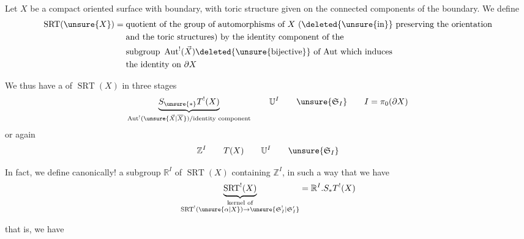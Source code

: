

Let $X$ be a compact oriented surface with boundary, with toric structure
given on the connected components of the boundary.
We define
\[
\begin{aligned}
\operatorname{SRT}(\unsure{X})={}&
\text{quotient of the group of automorphisms of }X
\text{ (\deleted{\unsure{in}} preserving the orientation}\\
&\text{and the toric structures) by the identity component of the}\\
&\text{subgroup }\operatorname{Aut}^!(\vec X)
\deleted{\unsure{\mathrm{bijective}}}
\text{ of Aut which induces}\\
&\text{the identity on }\partial X
\end{aligned}
\]

We thus have a  of $\operatorname{SRT}(X)$ in three stages
\[
\underbrace{S_{\unsure{*}}T^!(X)}_{
\operatorname{Aut}^!(\unsure{\vec X|\overline X})/
\text{identity component}}
\qquad\mathbb U^I\qquad\unsure{\mathfrak S_I}
\qquad I=\pi_0(\partial X)
\]
or again
\[
\mathbb Z^I\qquad T(X)\qquad\mathbb U^I\qquad\unsure{\mathfrak S_I}
\]

In fact, we define canonically! a  subgroup
$\mathbb R^I$ of $\operatorname{SRT}(X)$
containing $\mathbb Z^I$, in such a way that we have
\[
\underbrace{\operatorname{SRT}^!(X)}_{
\substack{\text{kernel of}\\
\operatorname{SRT}^!(\unsure{\alpha|X})\to\unsure{\mathfrak S_I^!|\mathfrak S_I'}}}
=\mathbb R^I.S_*T^!(X)
\]


that is, we have



